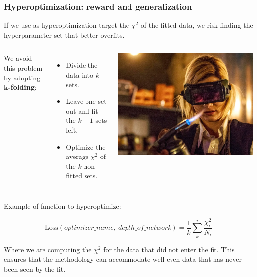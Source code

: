 \begin{frame}
    \frametitle{Hyperoptimization: reward and generalization}
    If we use as hyperoptimization target the $\chi^{2}$ of the fitted data, we risk finding the hyperparameter set that
    better overfits.


    \vfill

    \begin{columns}
        We avoid this problem by adopting \textbf{$\boldsymbol{k}$-folding}:

        \begin{itemize}
            \item Divide the data into $k$ sets.
            \item Leave one set out and fit the $k-1$ sets left.
            \item Optimize the average $\chi^{2}$ of the $k$ non-fitted sets.
        \end{itemize}
        \includegraphics[width=\textwidth]{juan_future_hyperopt/doctor.jpg}
    \end{columns}

    \vspace{0.4cm}

    Example of function to hyperoptimize:

    \begin{equation*}
        \text{Loss}(optimizer\_name,\ depth\_of\_network) = \frac{1}{k}\displaystyle\sum^{i}_{k} \frac{\chi^{2}_{i}}{N_{i}}
    \end{equation*}

    Where we are computing the $\chi^{2}$ for the data that did not enter the fit. This ensures that the methodology
    can accommodate well even data that has never been seen by the fit.

\end{frame}
